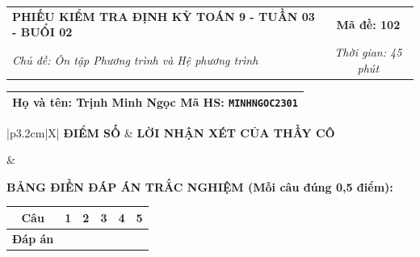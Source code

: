 \documentclass[12pt,a4paper]{article}
\begin{document}
\newpage


\noindent
\begin{tabularx}{\linewidth}{|X|c|}
\hline
\textbf{PHIẾU KIỂM TRA ĐỊNH KỲ TOÁN 9 - TUẦN 03 - BUỔI 02} & \textbf{Mã đề: 102} \\
\textit{Chủ đề: Ôn tập Phương trình và Hệ phương trình} & \textit{Thời gian: 45 phút} \\
\hline
\end{tabularx}

\vspace{1mm}

\noindent
\begin{tabularx}{\linewidth}{|X|}
\hline
\rule[-2mm]{0pt}{7.5mm}\textbf{Họ và tên:} \textbf{\large Trịnh Minh Ngọc} \hfill \textbf{Mã HS:} \texttt{MINHNGOC2301} \quad \\
\hline
\end{tabularx}

\vspace{1mm}

\noindent
\begin{tabularx}{\linewidth}{|p{3.2cm}|X|}
\hline
\centering\textbf{ĐIỂM SỐ} & \centering\textbf{LỜI NHẬN XÉT CỦA THẦY CÔ} \tabularnewline
\hline
\rule{0pt}{1.3cm} & \tabularnewline
\hline
\end{tabularx}

\vspace{1.2mm}

\noindent\textbf{BẢNG ĐIỀN ĐÁP ÁN TRẮC NGHIỆM (Mỗi câu đúng 0,5 điểm):}
\vspace{0.8mm}

\noindent
\renewcommand{\arraystretch}{1.35}
\begin{tabularx}{\linewidth}{|c|*{5}{>{\centering\arraybackslash}X|}}
\hline
\textbf{Câu} & \textbf{1} & \textbf{2} & \textbf{3} & \textbf{4} & \textbf{5} \\
\hline
\textbf{Đáp án} & & & & & \\
\hline
\end{tabularx}
\renewcommand{\arraystretch}{1.0}

\vspace{1.5mm}
\end{document}

